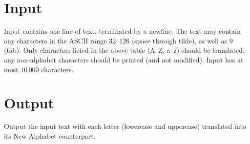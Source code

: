\section*{Input}
Input contains one line of text, terminated by a newline.
The text may contain any characters in the ASCII range $32$--$126$ (space through tilde), as well as $9$ (tab).
Only characters listed in the above table (A--Z, a--z) should be translated; any non-alphabet characters should be printed (and not modified).
Input has at most $10\,000$ characters.
\section*{Output}
Output the input text with each letter (lowercase and uppercase) translated into its New Alphabet counterpart.
